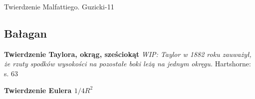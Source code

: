 

Twierdzenie Malfattiego.
Guzicki-11

\subsection{Bałagan}

\textbf{Twierdzenie Taylora, okrąg, sześciokąt}
{
    \emph{WIP: Taylor w 1882 roku zauważył, że rzuty spodków wysokości na pozostałe boki leżą na jednym okręgu.}
	Hartshorne: s. 63
}

\textbf{Twierdzenie Eulera $1/4R^2$}



%